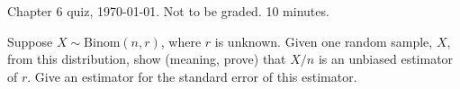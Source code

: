 \documentclass[12pt]{article}
\begin{document}
\thispagestyle{empty}

Chapter 6 quiz, \today. Not to be graded. 10 minutes.
\bigskip

Suppose $X \sim \text{Binom}(n, r)$,
where $r$ is unknown.
Given one random sample, $X$, from this distribution,
show (meaning, prove) that
$X/n$
is an unbiased estimator of $r$.
Give an estimator for the standard error of this estimator.
\end{document}

